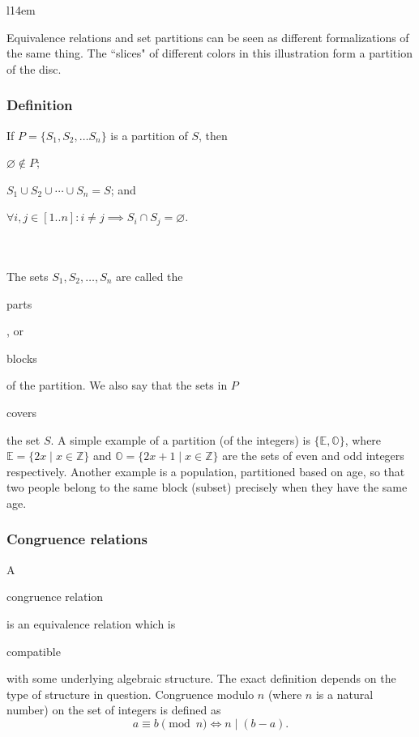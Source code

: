 \documentclass[11pt]{article}
\theoremstyle{plain}
\theoremstyle{definition}
\newenvironment{packed_items}{
\begin{itemize}
  \setlength{\itemsep}{1pt}
  \setlength{\parskip}{0pt}
  \setlength{\parsep}{0pt}
}{\end{itemize}}
\begin{document}
\begin{wrapfigure}[10]{l}{14em}
  \def\svgwidth{0.3\columnwidth}
  
\end{wrapfigure}

\noindent Equivalence relations and set partitions can be seen as different formalizations of the same thing.  
The ``slices" of different colors in this illustration form a partition of the disc. 
  
\subsubsection*{Definition}

\noindent If $ P = \{ S_1, S_2, \dots S_n \} $ is a partition of $ S $, then
\begin{packed_items}
\item $ \varnothing \notin P $;
\item $ S_1 \cup S_2 \cup \cdots \cup S_n = S $; and
\item $ \forall i, j \in [1 .. n] : i \ne j \implies S_i \cap S_j = \varnothing $.
\end{packed_items}

\ \\ \\
\noindent 
The sets $ S_1, S_2, \dots, S_n $ are called the \begin{em}parts\end{em}, or \begin{em}blocks\end{em} of the partition. 
We also say that the sets in $ P $ \begin{em}covers\end{em} the set $ S $.
A simple example of a partition (of the integers) is $ \{ \mathbb{E}, \mathbb{O} \} $, where $ \mathbb{E} = \{ 2x \mid x \in \mathbb{Z} \} $ and $ \mathbb{O} = \{ 2x + 1 \mid x \in \mathbb{Z} \} $ are the sets of even and odd integers respectively.
Another example is a population, partitioned based on age, so that two people belong to the same block (subset) precisely when they have the same age.

\subsubsection*{Congruence relations}

A \begin{em}congruence relation\end{em} is an equivalence relation which is \begin{em}compatible\end{em} with some underlying algebraic structure. %
The exact definition depends on the type of structure in question.
Congruence modulo $ n $ (where $ n $ is a natural number) on the set of integers is defined as
$$
  a \equiv b \pmod n \iff n \mid (b - a).
$$
\end{document}
